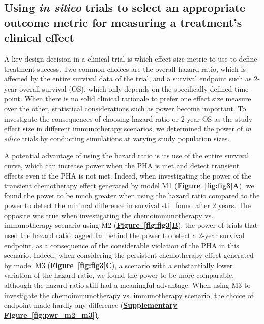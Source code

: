 \documentclass[a4paper,10pt]{article}
\newcommand{\myref}[2]{\hyperref[#1]{\bfseries Figure~\ref*{#1}#2}}
\newcommand{\mysupp}[2]{\hyperref[#1]{\bfseries Supplementary Figure~\ref*{#1}#2}}
\newcommand{\newbit}{\color{red!70!black}}
\begin{document}
{\newbit {}
\subsection*{Using \emph{in silico} trials to select an appropriate outcome metric for measuring a treatment's clinical effect}

A key design decision in a clinical trial is which effect size metric to use to define treatment success. 
Two common choices are the overall hazard ratio, which is affected by the entire survival data of the trial,
and a survival endpoint such as 2-year overall survival (OS), which only depends on the specifically defined time-point.
When there is no solid clinical rationale to prefer one effect size measure over the other, 
statistical considerations such as power become important. To investigate the consequences of choosing
hazard ratio or 2-year OS as the study effect size in different immunotherapy scenarios, we determined
the power of \emph{in silico} trials by conducting simulations at varying study population sizes.

A potential advantage of using the hazard ratio is its use of the entire survival curve, which can 
increase power when the PHA is met and detect transient effects even if the PHA is not met. 
Indeed,
when investigating the power of the transient chemotherapy effect generated by model M1 
(\myref{fig:fig3}{A}), we found the power to be much greater when using the hazard ratio compared to the 
power to detect the minimal difference in survival still found after 2 years. The opposite was
true when investigating the chemoimmunotherapy vs. immunotherapy scenario using M2 (\myref{fig:fig3}{B}):
the power of trials that used the hazard ratio lagged far behind the power to detect a 2-year survival endpoint,
as a consequence of the considerable violation of the PHA in this scenario. Indeed, when considering the 
persistent chemotherapy effect generated by model M3 (\myref{fig:fig3}{C}), a scenario with a substantially
lower variation of the hazard ratio, we found the power to be more comparable, although the hazard ratio 
still had a meaningful advantage. When using M3 to investigate the chemoimmunotherapy vs. immunotherapy scenario,
the choice of endpoint made hardly any difference (\mysupp{fig:pwr_m2_m3}).

}
\end{document}

